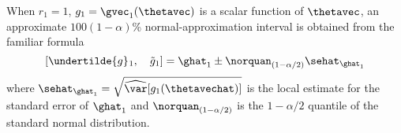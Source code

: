 When $r_{1}=1$, $g_{1} =\gvec_{1}(\thetavec)$
is a scalar function of
$\thetavec$,  an approximate
$100(1-\alpha)$\% normal-approximation interval is
obtained from the familiar formula
\begin{equation}
\label{equation:appendix.ci.for.function}
[\undertilde{g}_{}{}_{1}, \quad \tilde{g}_{1}]= \ghat_{1} \pm
 \norquan_{(1-\alpha/2)} \sehat_{\ghat_{1}}
\end{equation}
where $\sehat_{\ghat_{1}}=\sqrt{\widehat{\var}[g_{1}(\thetavechat)]}$
is the local estimate
for the standard error of $\ghat_{1}$ and $\norquan_{(1-\alpha/2)}$
is the $1-\alpha/2$ quantile of the standard normal distribution.
